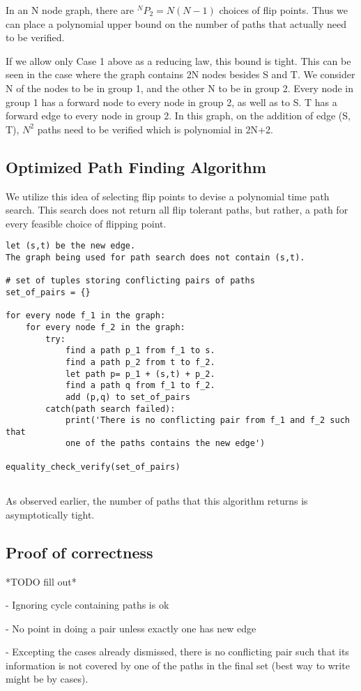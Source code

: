 \documentclass{article}
\begin{document}
In an N node graph, there are $^NP_2 = N(N-1)$ choices of flip points. Thus we can place a polynomial upper bound on the number of paths that actually need to be verified.

If we allow only Case 1 above as a reducing law, this bound is tight. 
This can be seen in the case where the graph contains 2N nodes besides S and T. We consider N of the nodes to be in group 1, and the other N to be in group 2. Every node in group 1 has a forward node to every node in group 2, as well as to S. T has a forward edge to every node in group 2. In this graph, on the addition of edge (S, T), $N^2$ paths need to be verified which is polynomial in 2N+2.

\subsection{Optimized Path Finding Algorithm}
We utilize this idea of selecting flip points to devise a polynomial time path search. This search does not return all flip tolerant paths, but rather, a path for every feasible choice of flipping point.

\begin{verbatim}
let (s,t) be the new edge.
The graph being used for path search does not contain (s,t).

# set of tuples storing conflicting pairs of paths
set_of_pairs = {}

for every node f_1 in the graph:
    for every node f_2 in the graph:
        try:
            find a path p_1 from f_1 to s.
            find a path p_2 from t to f_2.
            let path p= p_1 + (s,t) + p_2.
            find a path q from f_1 to f_2.
            add (p,q) to set_of_pairs    
        catch(path search failed):
            print('There is no conflicting pair from f_1 and f_2 such that
            one of the paths contains the new edge')

equality_check_verify(set_of_pairs)
            
\end{verbatim}

As observed earlier, the number of paths that this algorithm returns is asymptotically tight.

\subsection{Proof of correctness}

*TODO fill out*

- Ignoring cycle containing paths is ok

- No point in doing a pair unless exactly one has new edge

- Excepting the cases already dismissed, there is no conflicting pair such that its information is not covered by one of the paths in the final set (best way to write might be by cases).
\end{document}
